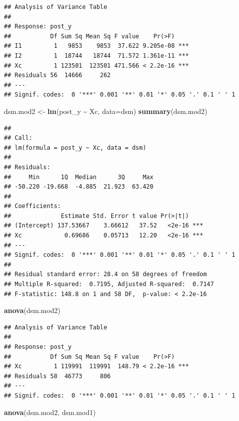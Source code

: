 \documentclass[
]{book}
\newenvironment{Shaded}{\begin{snugshade}}{\end{snugshade}}
\newcommand{\AttributeTok}[1]{\textcolor[rgb]{0.13,0.29,0.53}{#1}}
\newcommand{\FunctionTok}[1]{\textcolor[rgb]{0.13,0.29,0.53}{\textbf{#1}}}
\newcommand{\NormalTok}[1]{#1}
\newcommand{\OtherTok}[1]{\textcolor[rgb]{0.56,0.35,0.01}{#1}}
\newcommand{\SpecialCharTok}[1]{\textcolor[rgb]{0.81,0.36,0.00}{\textbf{#1}}}
\begin{document}
\begin{verbatim}
## Analysis of Variance Table
## 
## Response: post_y
##           Df Sum Sq Mean Sq F value    Pr(>F)    
## I1         1   9853    9853  37.622 9.205e-08 ***
## I2         1  18744   18744  71.572 1.361e-11 ***
## Xc         1 123501  123501 471.566 < 2.2e-16 ***
## Residuals 56  14666     262                      
## ---
## Signif. codes:  0 '***' 0.001 '**' 0.01 '*' 0.05 '.' 0.1 ' ' 1
\end{verbatim}

\begin{Shaded}
\begin{Highlighting}[]
\NormalTok{dsm.mod2 }\OtherTok{\textless{}{-}} \FunctionTok{lm}\NormalTok{(post\_y }\SpecialCharTok{\textasciitilde{}}\NormalTok{ Xc, }\AttributeTok{data=}\NormalTok{dsm)}
\FunctionTok{summary}\NormalTok{(dsm.mod2)}
\end{Highlighting}
\end{Shaded}

\begin{verbatim}
## 
## Call:
## lm(formula = post_y ~ Xc, data = dsm)
## 
## Residuals:
##     Min      1Q  Median      3Q     Max 
## -50.220 -19.668  -4.885  21.923  63.420 
## 
## Coefficients:
##              Estimate Std. Error t value Pr(>|t|)    
## (Intercept) 137.53667    3.66612   37.52   <2e-16 ***
## Xc            0.69686    0.05713   12.20   <2e-16 ***
## ---
## Signif. codes:  0 '***' 0.001 '**' 0.01 '*' 0.05 '.' 0.1 ' ' 1
## 
## Residual standard error: 28.4 on 58 degrees of freedom
## Multiple R-squared:  0.7195, Adjusted R-squared:  0.7147 
## F-statistic: 148.8 on 1 and 58 DF,  p-value: < 2.2e-16
\end{verbatim}

\begin{Shaded}
\begin{Highlighting}[]
\FunctionTok{anova}\NormalTok{(dsm.mod2)}
\end{Highlighting}
\end{Shaded}

\begin{verbatim}
## Analysis of Variance Table
## 
## Response: post_y
##           Df Sum Sq Mean Sq F value    Pr(>F)    
## Xc         1 119991  119991  148.79 < 2.2e-16 ***
## Residuals 58  46773     806                      
## ---
## Signif. codes:  0 '***' 0.001 '**' 0.01 '*' 0.05 '.' 0.1 ' ' 1
\end{verbatim}

\begin{Shaded}
\begin{Highlighting}[]
\FunctionTok{anova}\NormalTok{(dsm.mod2, dsm.mod1)}
\end{Highlighting}
\end{Shaded}
\end{document}
